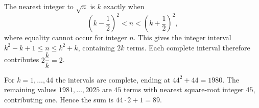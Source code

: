 The nearest integer to $\sqrt n$ is $k$ exactly when
\[
(k-\dfrac{1}{2})^2<n<(k+\dfrac{1}{2})^2,
\]
where equality cannot occur for integer $n$. This gives the integer interval $k^2-k+1\le n\le k^2+k$, containing $2k$ terms. Each complete interval therefore contributes $2\dfrac{k}{k}=2$.

For $k=1,\ldots,44$ the intervals are complete, ending at $44^2+44=1980$. The remaining values $1981,\ldots,2025$ are $45$ terms with nearest square-root integer $45$, contributing one. Hence the sum is $\boxed{44\cdot2+1=89}$.
